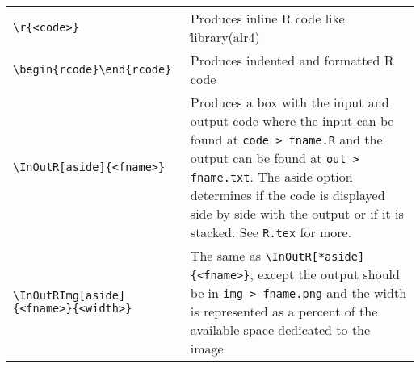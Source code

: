 \documentclass{gerot-assignment}
\begin{document}
\begin{answer}
    \begin{tabular}{p{}p{}}
        \verb|\r{<code>}| & Produces inline R code like \r{library(alr4)}\\[6pt]
        \verb|\begin{rcode}\end{rcode}| & Produces indented and formatted R code\\[6pt]
        \verb|\InOutR[aside]{<fname>}| &
        Produces a box with the input and output code where the input can be found at \texttt{code > fname.R} and the output can be found at \texttt{out > fname.txt}. The aside option determines if the code is displayed side by side with the output or if it is stacked. See \texttt{R.tex} for more. \\[59pt]
        \verb|\InOutRImg[aside]{<fname>}{<width>}| & The same as \verb|\InOutR[*aside]{<fname>}|, except the output should be in \texttt{img > fname.png} and the width is represented as a percent of the available space dedicated to the image
    \end{tabular}
\end{answer}
\end{document}
